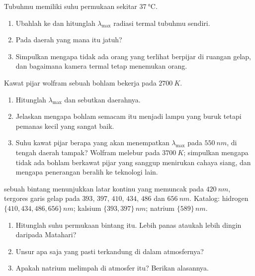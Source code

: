 \begin{exercise}[$\star\star$]\label{exo:g10:light-spectra:11}
Tubuhmu memiliki suhu permukaan sekitar $\qty{37}{\degreeCelsius}$.
\begin{enumerate}
  \item Ubahlah ke  dan hitunglah $\lambda_{\max}$ radiasi termal
        tubuhmu sendiri.
  \item Pada daerah yang mana  itu jatuh?
  \item Simpulkan mengapa tidak ada orang yang terlihat berpijar di
        ruangan gelap, dan bagaimana kamera termal tetap menemukan
        orang.
\end{enumerate}
\end{exercise}

\begin{exercise}[$\star\star\star$]\label{exo:g10:light-spectra:12}
Kawat pijar wolfram sebuah bohlam bekerja pada $\qty{2700}{K}$.
\begin{enumerate}
  \item Hitunglah $\lambda_{\max}$ dan sebutkan daerahnya.
  \item Jelaskan mengapa bohlam semacam itu menjadi lampu yang buruk
        tetapi pemanas kecil yang sangat baik.
  \item Suhu kawat pijar berapa yang akan menempatkan $\lambda_{\max}$
        pada $\qty{550}{nm}$, di tengah daerah tampak? Wolfram melebur
        pada $\qty{3700}{K}$; simpulkan mengapa tidak ada bohlam
        berkawat pijar yang sanggup menirukan cahaya siang, dan mengapa
        penerangan beralih ke teknologi lain.
\end{enumerate}
\end{exercise}

\begin{exercise}[$\star\star\star$]\label{exo:g10:light-spectra:13}
 sebuah bintang menunjukkan latar kontinu yang memuncak pada
$\qty{420}{nm}$, tergores garis gelap pada $393$, $397$, $410$, $434$,
$486$ dan $\qty{656}{nm}$. Katalog: hidrogen
$\{410, 434, 486, 656\}\,\unit{nm}$; kalsium $\{393, 397\}\,\unit{nm}$;
natrium $\{589\}\,\unit{nm}$.
\begin{enumerate}
  \item Hitunglah suhu permukaan bintang itu. Lebih panas ataukah lebih
        dingin daripada Matahari?
  \item Unsur apa saja yang pasti terkandung di dalam atmosfernya?
  \item Apakah natrium melimpah di atmosfer itu? Berikan alasannya.
\end{enumerate}
\end{exercise}

